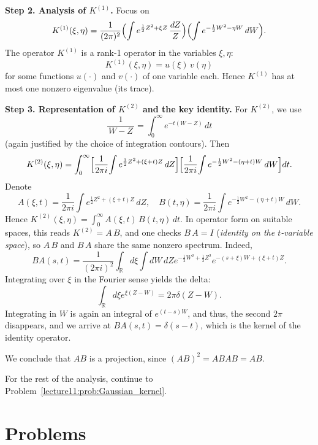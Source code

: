 \documentclass[letterpaper,11pt,oneside,reqno]{book}
\numberwithin{equation}{chapter}  %
\theoremstyle{definition}
\begin{document}
\medskip

\noindent\textbf{Step 2. Analysis of $K^{(1)}$.}
Focus on
\[
K^{(1)}(\xi,\eta)
=
\frac{1}{(2\pi)^2}
\Bigl(\int
e^{\frac12Z^2+\xi Z}\,\frac{dZ}{Z}\Bigr)
\Bigl(\int
e^{-\frac12W^2-\eta W}\,dW\Bigr).
\]
The operator $K^{(1)}$ is a rank-1 operator in the variables $\xi,\eta$:
\[
K^{(1)}(\xi,\eta)
=
u(\xi)\,v(\eta)
\]
for some functions $u(\cdot)$ and $v(\cdot)$ of one variable each.
Hence $K^{(1)}$ has at most one nonzero eigenvalue (its trace).

\medskip

\noindent\textbf{Step 3. Representation of $K^{(2)}$ and the key identity.}
For $K^{(2)}$, we use
\[
\frac{1}{\,W-Z\,}=\int_0^{\infty} e^{-t(W-Z)}\,dt
\]
(again justified by the choice of integration contours). Then
\[
K^{(2)}(\xi,\eta)
=
\int_0^\infty
\Bigl[
\frac{1}{2\pi i}\!\int
e^{\frac12Z^2+(\xi+t)Z}\,dZ
\Bigr]
\Bigl[
\frac{1}{2\pi i}\!\int
e^{-\frac12W^2-(\eta+t)W}\,dW
\Bigr]dt.
\]
Denote
\[
A(\xi,t)
=
\frac{1}{2\pi i}\int
e^{\frac12Z^2+(\xi+t)Z}\,dZ,
\quad
B(t,\eta)
=
\frac{1}{2\pi i}\int
e^{-\tfrac12W^2-(\eta+t)W}\,dW.
\]
Hence
\(
K^{(2)}(\xi,\eta)=\int_0^\infty A(\xi,t)\,B(t,\eta)\,dt.
\)
In operator form on suitable spaces,
this reads $K^{(2)}=A\,B$, and one checks $B\,A=I$
(\emph{identity on the $t$-variable space}),
so $A\,B$ and $B\,A$ share the same nonzero spectrum.
Indeed,
\begin{equation*}
	BA(s,t)=\frac{1}{(2\pi i)^2}
	\int_{\mathbb{R}}d\xi
	\int dW\, dZ
	e^{-\frac{1}{2}W^2+\frac{1}{2}Z^2}
	e^{-(s+\xi)W+(\xi+t)Z}.
\end{equation*}
Integrating over $\xi$ in the Fourier sense yields the delta:
\begin{equation*}
	\int_{\mathbb{R}}d\xi e^{\xi(Z-W)}=2\pi\delta(Z-W).
\end{equation*}
Integrating in $W$ is again an integral of $e^{(t-s)W}$, and thus, the second $2\pi$ disappears,
and we arrive at $BA(s,t)=\delta(s-t)$, which is the kernel of the identity operator.

We conclude that $AB$ is a projection, since
$(AB)^2=ABAB=AB$.

\medskip
For the rest of
the analysis, continue to
Problem~\ref{lecture11:prob:Gaussian_kernel}.









\section{Problems}
\end{document}
